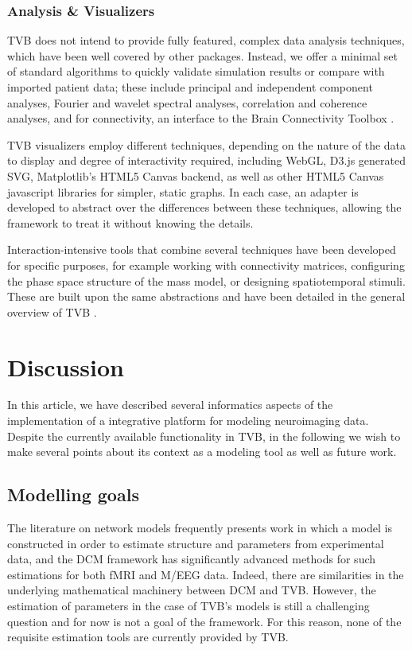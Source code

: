\documentclass{bioinfo}
\begin{document}
\subsubsection{Analysis \& Visualizers}

TVB does not intend to provide fully featured, complex data analysis
techniques, which have been well covered by other packages. 
Instead, we offer a minimal set of standard algorithms to quickly
validate simulation results or compare with imported patient data; 
these include principal and independent component analyses, 
Fourier and wavelet spectral analyses, correlation and coherence
analyses, and for connectivity, an interface to the Brain 
Connectivity Toolbox \citep{Rubinov_2010}. 

TVB visualizers employ different techniques, depending on the nature of
the data to display and degree of interactivity required, including WebGL,
D3.js generated SVG, Matplotlib's HTML5 Canvas backend, as well as other
HTML5 Canvas javascript libraries for simpler, static graphs. In each case,
an adapter is developed to abstract over the differences between these
techniques, allowing the framework to treat it without knowing the details.

Interaction-intensive tools that combine several techniques have been developed
for specific purposes, for example working with connectivity matrices, 
configuring the phase space structure of the mass model, or designing
spatiotemporal stimuli. These are built upon the same abstractions and have been
detailed in the general overview of TVB \citep{Sanz-Leon_2013}.

\section{Discussion}

In this article, we have described several informatics aspects of the
implementation of a integrative platform for modeling neuroimaging data.
Despite the currently available functionality in TVB, in the following we wish
to make several points about its context as a modeling tool as well as 
future work. 

\subsection{Modelling goals}

The literature on network models frequently presents work in which a model
is constructed in order to estimate structure and parameters from 
experimental data, and the DCM framework has significantly advanced 
methods for such estimations for both fMRI and M/EEG data. Indeed, there
are similarities in the underlying mathematical machinery between DCM and 
TVB. However, the estimation of parameters in the case of TVB's models
is still a challenging question and for now is not a goal of the framework. 
For this reason, none of the requisite estimation tools are currently 
provided by TVB.
\end{document}
